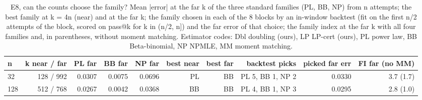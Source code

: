 \begin{table}[t]
\centering
\small
\begin{tabular}{lrrrrrrrrr}
\toprule
n & k near / far & PL far & BB far & NP far & best near & best far & backtest picks & picked far err & FI far (no MM) \\
\midrule
32 & 128 / 992 & 0.0307 & 0.0075 & 0.0696 & PL & BB & PL 5, BB 1, NP 2 & 0.0330 & 3.7 (1.7) \\
128 & 512 / 768 & 0.0267 & 0.0042 & 0.0368 & BB & BB & PL 4, BB 1, NP 3 & 0.0295 & 2.8 (1.0) \\
\bottomrule
\end{tabular}
\caption{E8, can the counts choose the family? Mean |error| at the far k of the three standard families (PL, BB, NP) from n attempts; the best family at k = 4n (near) and at the far k; the family chosen in each of the 8 blocks by an in-window backtest (fit on the first n/2 attempts of the block, scored on pass@k for k in (n/2, n]) and the far error of that choice; the family index at the far k with all four families and, in parentheses, without moment matching. Estimator codes: Dbl doubling (ours), LP LP-cert (ours), PL power law, BB Beta-binomial, NP NPMLE, MM moment matching.}
\label{tab:T13b_ground_truth_family_choice}
\end{table}
